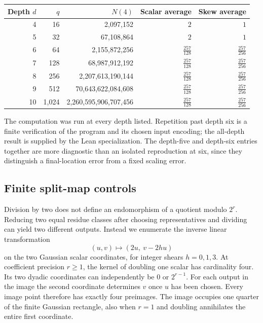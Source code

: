 \documentclass[12pt,letterpaper]{article}
\begin{document}
\begin{center}\small\begin{tabular}{@{}rrrrr@{}}\toprule
Depth $d$ & $q$ & $N(4)$ & Scalar average & Skew average\\\midrule
4 & 16 & 2,097,152 & $2$ & $1$\\
5 & 32 & 67,108,864 & $2$ & $1$\\
6 & 64 & 2,155,872,256 & $\frac{257}{128}$ & $\frac{257}{256}$\\
7 & 128 & 68,987,912,192 & $\frac{257}{128}$ & $\frac{257}{256}$\\
8 & 256 & 2,207,613,190,144 & $\frac{257}{128}$ & $\frac{257}{256}$\\
9 & 512 & 70,643,622,084,608 & $\frac{257}{128}$ & $\frac{257}{256}$\\
10 & 1,024 & 2,260,595,906,707,456 & $\frac{257}{128}$ & $\frac{257}{256}$\\
\bottomrule\end{tabular}\end{center}
The computation was run at every depth listed. Repetition past depth six is a finite verification of the program and its chosen input encoding; the all-depth result is supplied by the Lean specialization. The depth-five and depth-six entries together are more diagnostic than an isolated reproduction at six, since they distinguish a final-location error from a fixed scaling error.

\subsection{Finite split-map controls}
Division by two does not define an endomorphism of a quotient modulo $2^r$. Reducing two equal residue classes after choosing representatives and dividing can yield two different outputs. Instead we enumerate the inverse linear transformation
\[
   (u,v)\longmapsto (2u,\ v-2hu)
\]
on the two Gaussian scalar coordinates, for integer shears $h=0,1,3$. At coefficient precision $r\ge1$, the kernel of doubling one scalar has cardinality four. Its two dyadic coordinates can independently be $0$ or $2^{r-1}$. For each output in the image the second coordinate determines $v$ once $u$ has been chosen. Every image point therefore has exactly four preimages. The image occupies one quarter of the finite Gaussian rectangle, also when $r=1$ and doubling annihilates the entire first coordinate.
\end{document}
